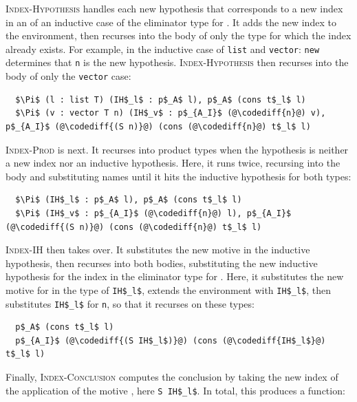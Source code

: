 \textsc{Index-Hypothesis} handles each new hypothesis that corresponds to a new index in an 
of an inductive case of the eliminator type for \AI. It adds the new index to the environment, then recurses into the body of only the
type for which the index already exists. For example, in the inductive case of \lstinline{list} and \lstinline{vector}:
\lstinline{new} determines that \lstinline{n} is the new hypothesis.
\textsc{Index-Hypothesis} then recurses into the body of only the \lstinline{vector} case:

\begin{lstlisting}
  $\Pi$ (l : list T) (IH$_l$ : p$_A$ l), p$_A$ (cons t$_l$ l)
  $\Pi$ (v : vector T n) (IH$_v$ : p$_{A_I}$ (@\codediff{n}@) v), p$_{A_I}$ (@\codediff{(S n)}@) (cons (@\codediff{n}@) t$_l$ l)
\end{lstlisting}
\textsc{Index-Prod} is next. It recurses into product types when the hypothesis is neither a new index nor an inductive hypothesis. Here, it runs twice, recursing into the body and substituting names %
until it hits the inductive hypothesis for both types:

\begin{lstlisting}
  $\Pi$ (IH$_l$ : p$_A$ l), p$_A$ (cons t$_l$ l)
  $\Pi$ (IH$_v$ : p$_{A_I}$ (@\codediff{n}@) l), p$_{A_I}$ (@\codediff{(S n)}@) (cons (@\codediff{n}@) t$_l$ l)
\end{lstlisting}
\textsc{Index-IH} then takes over. It substitutes the new motive in the inductive hypothesis, then recurses into both bodies, 
substituting the new inductive hypothesis for the index in the eliminator type for \AI.
Here, it substitutes the new motive
for  in the type of \lstinline{IH$_l$}, extends the environment with \lstinline{IH$_l$}, then 
substitutes \lstinline{IH$_l$} for \lstinline{n}, so that it recurses on these types:

\begin{lstlisting}
  p$_A$ (cons t$_l$ l)
  p$_{A_I}$ (@\codediff{(S IH$_l$)}@) (cons (@\codediff{IH$_l$}@) t$_l$ l)
\end{lstlisting}
Finally, \textsc{Index-Conclusion} computes the conclusion by taking the new index of the application of the motive ,
here \lstinline{S IH$_l$}.
In total, this produces a function:

